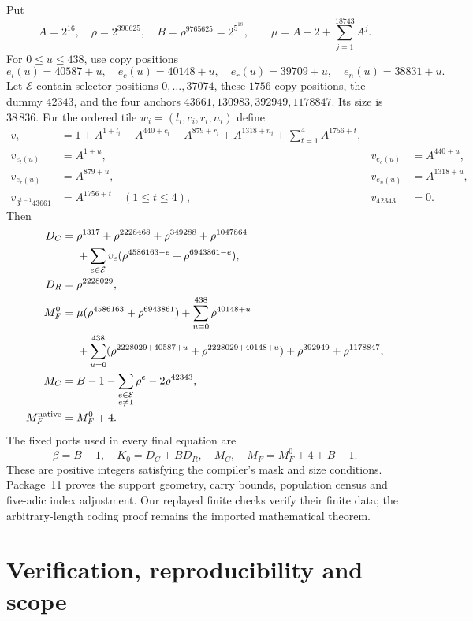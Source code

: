 \documentclass[11pt,a4paper]{article}
\theoremstyle{remark}
\begin{document}
Put
\[
 A=2^{16},\quad\rho=2^{390625},\quad
 B=\rho^{9765625}=2^{5^{18}},\qquad
 \mu=A-2+\sum_{j=1}^{18743}A^j.
\]
For $0\le u\le438$, use copy positions
\[
 e_l(u)=40587+u,\quad e_c(u)=40148+u,\quad
 e_r(u)=39709+u,\quad e_n(u)=38831+u.
\]
Let $\mathcal E$ contain selector positions $0,\ldots,37074$, these
$1756$ copy positions, the dummy $42343$, and the four anchors
$43661,130983,392949,1178847$.  Its size is $38\,836$.
For the ordered tile $w_i=(l_i,c_i,r_i,n_i)$ define
\begin{align*}
 v_i&=1+A^{1+l_i}+A^{440+c_i}+A^{879+r_i}+A^{1318+n_i}
               +\sum_{t=1}^4 A^{1756+t},\\
 v_{e_l(u)}&=A^{1+u},&v_{e_c(u)}&=A^{440+u},\\
 v_{e_r(u)}&=A^{879+u},&v_{e_n(u)}&=A^{1318+u},\\
 v_{3^{t-1}43661}&=A^{1756+t}\quad(1\le t\le4),&v_{42343}&=0.
\end{align*}
Then
\begin{align*}
 D_C={}&\rho^{1317}+\rho^{2228468}+\rho^{349288}+\rho^{1047864}\\
 &+\sum_{e\in\mathcal E}v_e
       (\rho^{4586163-e}+\rho^{6943861-e}),\\
 D_R={}&\rho^{2228029},\\
 M_F^0={}&\mu(\rho^{4586163}+\rho^{6943861})
       +\sum_{u=0}^{438}\rho^{40148+u}\\
 &+\sum_{u=0}^{438}
       (\rho^{2228029+40587+u}+\rho^{2228029+40148+u})
       +\rho^{392949}+\rho^{1178847},\\
 M_C={}&B-1-\sum_{\substack{e\in\mathcal E\\e\ne1}}\rho^e-2\rho^{42343},\\
 M_F^{\rm native}={}&M_F^0+4.
\end{align*}
The fixed ports used in every final equation are
\begin{equation}
 \boxed{\beta=B-1,\quad K_0=D_C+BD_R,\quad M_C,
       \quad M_F=M_F^0+4+B-1.}
 \label{eq:fixed-ports}
\end{equation}
These are positive integers satisfying the compiler's mask and size
conditions.  Package~11 proves the support geometry, carry bounds,
population census and five-adic index adjustment.  Our replayed finite
checks verify their finite data; the arbitrary-length coding proof
remains the imported mathematical theorem.

\section{Verification, reproducibility and scope}
\label{sec:verification}
\end{document}
